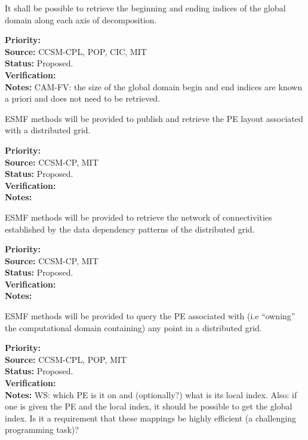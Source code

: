 
It shall be possible to retrieve the beginning and ending indices of the
global domain along each axis of decomposition.

\begin{reqlist}
{\bf Priority:} \\
{\bf Source:} CCSM-CPL, POP, CIC, MIT \\
{\bf Status:} Proposed. \\
{\bf Verification:} \\
{\bf Notes:} CAM-FV: the size of the global domain begin and end
indices are known a priori and does not need to be retrieved.
\end{reqlist}


ESMF methods will be provided to publish and retrieve the PE layout
associated with a distributed grid.

\begin{reqlist}
{\bf Priority:} \\
{\bf Source:} CCSM-CP, MIT \\
{\bf Status:} Proposed. \\
{\bf Verification:} \\
{\bf Notes:}
\end{reqlist}


ESMF methods will be provided to retrieve the network of
connectivities established by the data dependency patterns of the
distributed grid.

\begin{reqlist}
{\bf Priority:} \\
{\bf Source:} CCSM-CP, MIT \\
{\bf Status:} Proposed. \\
{\bf Verification:} \\
{\bf Notes:}
\end{reqlist}


ESMF methods will be provided to query the PE associated with (i.e
``owning'' the computational domain containing) any point in a
distributed grid.

\begin{reqlist}
{\bf Priority:} \\ 
{\bf Source:} CCSM-CPL, POP, MIT \\
{\bf Status:} Proposed. \\
{\bf Verification:} \\
{\bf Notes:} WS: which PE is it on and (optionally?) what 
is its local index.  Also: if one is given the PE and the local index, 
it should be possible to get the global index.  Is it a requirement that
these mappings be highly efficient (a challenging programming task)?
\end{reqlist}

